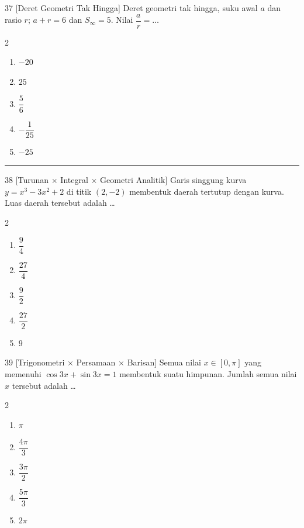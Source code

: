 \documentclass[11pt]{article}
\newenvironment{pilB}{%
  \par\smallskip\begin{multicols}{2}
  \begin{enumerate}[label=(\alph*),leftmargin=*,itemsep=1pt,topsep=3pt]}%
  {\end{enumerate}\end{multicols}}
\begin{document}
\begin{soal}{37 \normalfont\small[Deret Geometri Tak Hingga]}
Deret geometri tak hingga, suku awal $a$ dan rasio $r$; $a+r=6$ dan $S_\infty=5$. Nilai $\dfrac{a}{r}=\ldots$
\begin{pilB}
  \item $-20$ \item $25$ \item $\dfrac56$ \item $-\dfrac{1}{25}$ \item $-25$
\end{pilB}
\end{soal}


\smallskip\hrule\medskip

\begin{soal}{38 \normalfont\small[Turunan $\times$ Integral $\times$ Geometri Analitik]}
Garis singgung kurva $y=x^3-3x^2+2$ di titik $(2,-2)$ membentuk daerah tertutup dengan kurva.
Luas daerah tersebut adalah \ldots
\begin{pilB}
  \item $\dfrac{9}{4}$ \item $\dfrac{27}{4}$ \item $\dfrac{9}{2}$ \item $\dfrac{27}{2}$ \item $9$
\end{pilB}
\end{soal}

\begin{soal}{39 \normalfont\small[Trigonometri $\times$ Persamaan $\times$ Barisan]}
Semua nilai $x\in[0,\pi]$ yang memenuhi $\cos3x+\sin3x=1$ membentuk suatu himpunan.
Jumlah semua nilai $x$ tersebut adalah \ldots
\begin{pilB}
  \item $\pi$ \item $\dfrac{4\pi}{3}$ \item $\dfrac{3\pi}{2}$ \item $\dfrac{5\pi}{3}$ \item $2\pi$
\end{pilB}
\end{soal}
\end{document}
